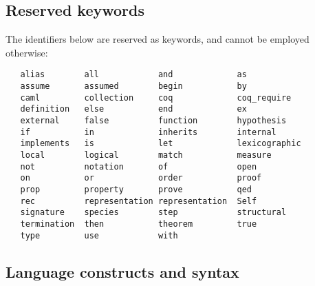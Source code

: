 \subsection{Reserved keywords}
The identifiers below are reserved as keywords, and cannot be employed
otherwise:
\begin{verbatim}
   alias        all            and             as
   assume       assumed        begin           by
   caml         collection     coq             coq_require
   definition   else           end             ex
   external     false          function        hypothesis
   if           in             inherits        internal
   implements   is             let             lexicographic
   local        logical        match           measure
   not          notation       of              open
   on           or             order           proof
   prop         property       prove           qed
   rec          representation representation  Self
   signature    species        step            structural
   termination  then           theorem         true
   type         use            with
\end{verbatim}



\subsection{Language constructs and syntax}

